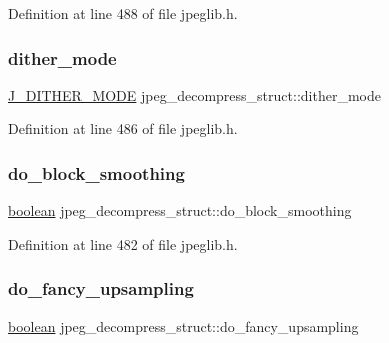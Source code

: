 Definition at line 488 of file jpeglib.\+h.

\mbox{\label{structjpeg__decompress__struct_aba971605eafdb9c84ed2c4182a957200}} 
\subsubsection{\texorpdfstring{dither\_mode}{dither\_mode}}
{\footnotesize\ttfamily \mbox{\hyperlink{jpeglib_8h_a23ab65fc4cdbe8bb0ac7a8ca76d29653}{J\+\_\+\+D\+I\+T\+H\+E\+R\+\_\+\+M\+O\+DE}} jpeg\+\_\+decompress\+\_\+struct\+::dither\+\_\+mode}



Definition at line 486 of file jpeglib.\+h.

\mbox{\label{structjpeg__decompress__struct_a4a78a03478c9296b9f5d4b390b952b6b}} 
\subsubsection{\texorpdfstring{do\_block\_smoothing}{do\_block\_smoothing}}
{\footnotesize\ttfamily \mbox{\hyperlink{jmorecfg_8h_a7c6368b321bd9acd0149b030bb8275ed}{boolean}} jpeg\+\_\+decompress\+\_\+struct\+::do\+\_\+block\+\_\+smoothing}



Definition at line 482 of file jpeglib.\+h.

\mbox{\label{structjpeg__decompress__struct_a40d8902de27f5c64846fabf035372ca3}} 
\subsubsection{\texorpdfstring{do\_fancy\_upsampling}{do\_fancy\_upsampling}}
{\footnotesize\ttfamily \mbox{\hyperlink{jmorecfg_8h_a7c6368b321bd9acd0149b030bb8275ed}{boolean}} jpeg\+\_\+decompress\+\_\+struct\+::do\+\_\+fancy\+\_\+upsampling}



